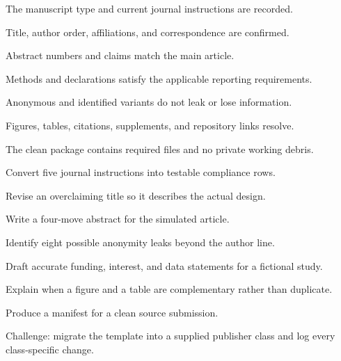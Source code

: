 \chaptercheck
\begin{chapterchecklist}
  \item The manuscript type and current journal instructions are recorded.
  \item Title, author order, affiliations, and correspondence are confirmed.
  \item Abstract numbers and claims match the main article.
  \item Methods and declarations satisfy the applicable reporting requirements.
  \item Anonymous and identified variants do not leak or lose information.
  \item Figures, tables, citations, supplements, and repository links resolve.
  \item The clean package contains required files and no private working debris.
\end{chapterchecklist}

\chapterexercisestitle
\begin{chapterexercises}
  \item Convert five journal instructions into testable compliance rows.
  \item Revise an overclaiming title so it describes the actual design.
  \item Write a four-move abstract for the simulated article.
  \item Identify eight possible anonymity leaks beyond the author line.
  \item Draft accurate funding, interest, and data statements for a fictional study.
  \item Explain when a figure and a table are complementary rather than duplicate.
  \item Produce a manifest for a clean source submission.
  \item Challenge: migrate the template into a supplied publisher class and log
        every class-specific change.
\end{chapterexercises}
